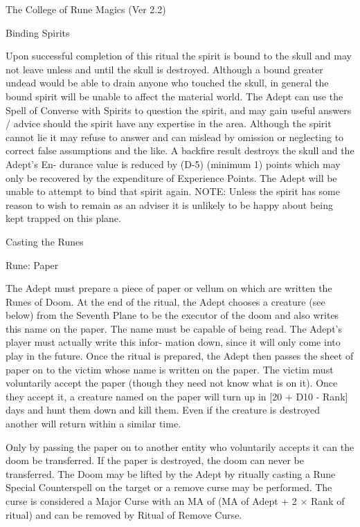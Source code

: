 \begin{Chapter}{The College of Rune Magics (Ver 2.2)}
\begin{ritual}[R-2]{Binding Spirits }
\begin{effects}
Upon successful completion of this ritual the spirit is bound to the
skull and may not leave unless and until the skull is destroyed.
Although a bound greater undead would be able to drain anyone who
touched the skull, in general the bound spirit will be unable to
affect the material world.  The Adept can use the Spell of Converse
with Spirits to question the spirit, and may gain useful answers /
advice should the spirit have any expertise in the area. Although the
spirit cannot lie it may refuse to answer and can mislead by omission
or neglecting to correct false assumptions and the like.  A backfire
result destroys the skull and the Adept’s En- durance value is reduced
by (D-5) (minimum 1) points which may only be recovered by the
expenditure of Experience Points.  The Adept will be unable to attempt
to bind that spirit again.  NOTE: Unless the spirit has some reason to
wish to remain as an adviser it is unlikely to be happy about being
kept trapped on this plane.
\end{effects}
\end{ritual}

\begin{ritual}[R-3]{Casting the Runes }

Rune: Paper 
\begin{effects}
The Adept must prepare a piece of paper or vellum on which are written
the Runes of Doom.  At the end of the ritual, the Adept chooses a
creature (see below) from the Seventh Plane to be the executor of the
doom and also writes this name on the paper. The name must be capable
of being read.  The Adept’s player must actually write this infor-
mation down, since it will only come into play in the future.  Once
the ritual is prepared, the Adept then passes the sheet of paper on to
the victim whose name is written on the paper.  The victim must
voluntarily accept the paper (though they need not know what is on
it). Once they accept it, a creature named on the paper will turn up
in [20 + D10 - Rank] days and hunt them down and kill them. Even if
the creature is destroyed another will return within a similar time.

Only by passing the paper on to another entity who voluntarily accepts
it can the doom be transferred.  If the paper is destroyed, the doom
can never be transferred. The Doom may be lifted by the Adept by
ritually casting a Rune Special Counterspell on the target or a remove
curse may be performed.  The curse is considered a Major Curse with an
MA of (MA of Adept + 2 × Rank of ritual) and can be removed by Ritual
of Remove Curse.


\end{effects}
\end{ritual}
\end{Chapter}

